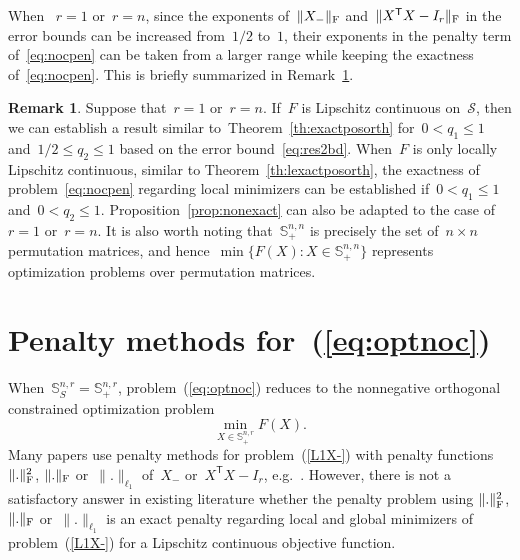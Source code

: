 \documentclass[11pt,a4paper]{article}  %
\theoremstyle{definition}
\newtheorem{remark}{Remark}%
\newcommand{\sset}{\mathcal{S}}
\newcommand{\col}{r}
\newcommand{\stf}[1]{\mathbb{S}^{#1}}
\newcommand{\fro}{{\scriptstyle{\textnormal{F}}}}
\newcommand{\trs}{{\scriptstyle{\mathsf{T}}}}
\newcommand{\tsign}{{\scriptscriptstyle{S}}}
\begin{document}
When~
$\col = 1$ or~$\col = n$,
since the exponents of~$\|X_{-}\|_\fro$ and~$\|X^\trs X - I_\col\|_\fro$
in the error bounds can be increased from~$1/2$ to~$1$, their exponents in the penalty term
of~\eqref{eq:nocpen} can be taken from a larger range while keeping the exactness of~\eqref{eq:nocpen}.
This is briefly summarized in Remark~\ref{rem:r1n}.
\begin{remark}
    \label{rem:r1n}
    Suppose that~$\col = 1$ or~$\col = n$.
    If~$F$ is Lipschitz continuous on~$\sset$, then we can establish a result similar
    to~Theorem~\ref{th:exactposorth} for~$0<q_1 \le 1$ and~$1/2 \le q_2 \le 1$ based on the error
    bound~\eqref{eq:res2bd}.
    When~$F$ is only locally Lipschitz continuous, similar to Theorem~\ref{th:lexactposorth}, the
    exactness of problem~\eqref{eq:nocpen} regarding local minimizers can be established
    if~$0< q_1 \le 1$ and~$0< q_2 \le 1$.
    Proposition~\ref{prop:nonexact} can also be adapted to the case of~$\col = 1$ or~$\col = n$.
    It is also worth noting that~$\stf{n,n}_+$ is precisely the
    set of~$n\times n$ permutation matrices, and
    hence~$\min\{F(X) \mathrel{:} X \in \stf{n,n} _+\}$
    represents optimization problems over permutation matrices.
\end{remark}


\section{Penalty methods for~(\ref{eq:optnoc})}
\label{sec:test}

When~$\stf{n,\col}_\tsign= \stf{n,\col}_+$, problem~(\ref{eq:optnoc}) reduces to the nonnegative orthogonal constrained optimization problem
\begin{equation}\label{L1X-}
\min_{X\in  \stf{n,\col}_{+}} F(X).
\end{equation}
Many papers use penalty methods  for problem~(\ref{L1X-})  with  penalty functions
$\|.\|_\fro^2$, $\|.\|_\fro$ or~$\|.\|_{\ell_1}$ of~$X_{-}$ or~$X^\trs X-I_\col$,
e.g.~\cite{Ahookhosh_etal_2021,Luo_Ding_Huang_Li_2009,Yang_etal_2012,Zass_Shashua_2006}.
However, there is not a satisfactory answer in existing literature whether the penalty problem using
 $\|.\|_\fro^2$, $\|.\|_\fro$ or~$\|.\|_{\ell_1}$  is an exact penalty regarding local and global
 minimizers of problem~(\ref{L1X-}) for a Lipschitz continuous objective function.
\end{document}
